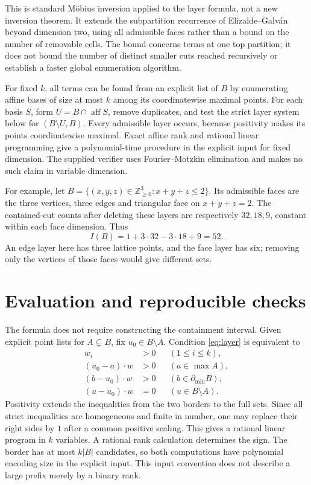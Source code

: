 \documentclass[11pt]{article}
\theoremstyle{remark}
\newcommand{\NN}{\mathbb Z_{\geq0}}
\newcommand{\bd}{\partial_{\min}}
\begin{document}
This is standard M\"obius inversion applied to the layer formula, not a new
inversion theorem. It extends the subpartition recurrence of
Elizalde--Galv\'an~\cite[Lemma~7.1 in the preprint]{EG} beyond dimension two,
using all admissible faces rather than a bound on the number of removable
cells. The bound concerns terms at one top partition; it does not bound the
number of distinct smaller cuts reached recursively or establish a faster
global enumeration algorithm.

For fixed $k$, all terms can be found from an explicit list of $B$ by
enumerating affine bases of size at most $k$ among its coordinatewise maximal
points. For each basis $S$, form $U=B\cap\operatorname{aff}S$, remove
duplicates, and test the strict layer system below for $(B\setminus U,B)$.
Every admissible layer occurs, because positivity makes its points
coordinatewise maximal. Exact affine rank and rational linear programming
give a polynomial-time procedure in the explicit input for fixed dimension.
The supplied verifier uses Fourier--Motzkin elimination and makes no such
claim in variable dimension.

For example, let $B=\{(x,y,z)\in\NN^3:x+y+z\leq2\}$. Its admissible
faces are the three vertices, three edges and triangular face on $x+y+z=2$.
The contained-cut counts after deleting these layers are respectively
$32,18,9$, constant within each face dimension. Thus
\[
 I(B)=1+3\cdot32-3\cdot18+9=52.
\]
An edge layer here has three lattice points, and the face layer has six;
removing only the vertices of those faces would give different sets.

\section{Evaluation and reproducible checks}

The formula does not require constructing the containment interval.
Given explicit point lists for $A\subsetneq B$, fix $u_0\in B\setminus A$.
Condition \eqref{eq:layer} is equivalent to
\begin{align*}
 w_i&>0 &&(1\leq i\leq k),\\
 (u_0-a)\cdot w&>0 &&(a\in\max A),\\
 (b-u_0)\cdot w&>0 &&(b\in\bd B),\\
 (u-u_0)\cdot w&=0 &&(u\in B\setminus A).
\end{align*}
Positivity extends the inequalities from the two borders to the full
sets. Since all strict inequalities are homogeneous and finite in number,
one may replace their right sides by $1$ after a common positive scaling.
This gives a rational linear program in $k$ variables. A rational rank
calculation determines the sign. The border has at most $k|B|$ candidates,
so both computations have polynomial encoding size in the explicit input.
This input convention does not describe a large prefix merely by a binary rank.
\end{document}
